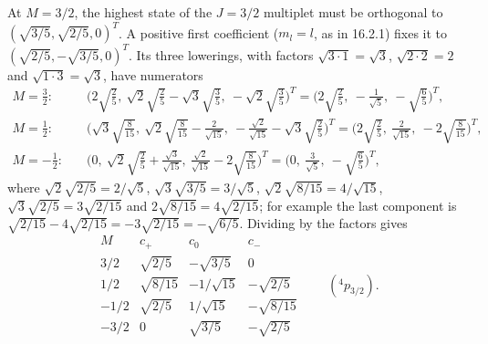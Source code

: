 At $M=3/2$, the highest state of the $J=3/2$ multiplet must be
orthogonal to $(\sqrt{3/5},\sqrt{2/5},0)^T$. A positive first
coefficient ($m_l=l$, as in 16.2.1) fixes it to
$(\sqrt{2/5},-\sqrt{3/5},0)^T$.
Its three lowerings, with factors $\sqrt{3\cdot1}=\sqrt3$,
$\sqrt{2\cdot2}=2$ and $\sqrt{1\cdot3}=\sqrt3$, have numerators
\[
\begin{aligned}
M=\tfrac32:&\quad
\bigl(2\sqrt{\tfrac25},\ \sqrt2\sqrt{\tfrac25}-\sqrt3\sqrt{\tfrac35},\
-\sqrt2\sqrt{\tfrac35}\bigr)^T
=\bigl(2\sqrt{\tfrac25},\ -\tfrac1{\sqrt5},\ -\sqrt{\tfrac65}\bigr)^T,\\
M=\tfrac12:&\quad
\bigl(\sqrt3\sqrt{\tfrac8{15}},\
\sqrt2\sqrt{\tfrac8{15}}-\tfrac2{\sqrt{15}},\
-\tfrac{\sqrt2}{\sqrt{15}}-\sqrt3\sqrt{\tfrac25}\bigr)^T
=\bigl(2\sqrt{\tfrac25},\ \tfrac2{\sqrt{15}},\
-2\sqrt{\tfrac8{15}}\bigr)^T,\\
M=-\tfrac12:&\quad
\bigl(0,\ \sqrt2\sqrt{\tfrac25}+\tfrac{\sqrt3}{\sqrt{15}},\
\tfrac{\sqrt2}{\sqrt{15}}-2\sqrt{\tfrac8{15}}\bigr)^T
=\bigl(0,\ \tfrac3{\sqrt5},\ -\sqrt{\tfrac65}\bigr)^T,
\end{aligned}
\]
where $\sqrt2\sqrt{2/5}=2/\sqrt5$, $\sqrt3\sqrt{3/5}=3/\sqrt5$,
$\sqrt2\sqrt{8/15}=4/\sqrt{15}$, $\sqrt3\sqrt{2/5}=3\sqrt{2/15}$ and
$2\sqrt{8/15}=4\sqrt{2/15}$; for example the last component is
$\sqrt{2/15}-4\sqrt{2/15}=-3\sqrt{2/15}=-\sqrt{6/5}$.
Dividing by the factors gives
\[
\boxed{\begin{array}{c|ccc}
M&c_+&c_0&c_-\\ \hline
3/2&\sqrt{2/5}&-\sqrt{3/5}&0\\
1/2&\sqrt{8/15}&-1/\sqrt{15}&-\sqrt{2/5}\\
-1/2&\sqrt{2/5}&1/\sqrt{15}&-\sqrt{8/15}\\
-3/2&0&\sqrt{3/5}&-\sqrt{2/5}
\end{array}}\qquad ({}^4p_{3/2}).
\]

